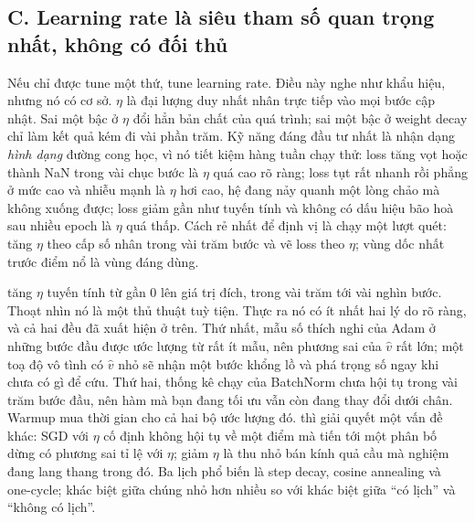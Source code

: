 \documentclass[../../../deep_learning.tex]{subfiles}
\begin{document}
\subsection{C. Learning rate là siêu tham số quan trọng nhất, không có đối thủ}
Nếu chỉ được tune một thứ, tune learning rate. Điều này nghe như khẩu hiệu, nhưng nó có cơ sở. \(\eta\) là đại lượng duy nhất nhân trực tiếp vào mọi bước cập nhật. Sai một bậc ở \(\eta\) đổi hẳn bản chất của quá trình; sai một bậc ở weight decay chỉ làm kết quả kém đi vài phần trăm. Kỹ năng đáng đầu tư nhất là nhận dạng \emph{hình dạng} đường cong học, vì nó tiết kiệm hàng tuần chạy thử: loss tăng vọt hoặc thành NaN trong vài chục bước là \(\eta\) quá cao rõ ràng; loss tụt rất nhanh rồi phẳng ở mức cao và nhiễu mạnh là \(\eta\) hơi cao, hệ đang nảy quanh một lòng chảo mà không xuống được; loss giảm gần như tuyến tính và không có dấu hiệu bão hoà sau nhiều epoch là \(\eta\) quá thấp. Cách rẻ nhất để định vị là chạy một lượt quét: tăng \(\eta\) theo cấp số nhân trong vài trăm bước và vẽ loss theo \(\eta\); vùng dốc nhất trước điểm nổ là vùng đáng dùng.

 tăng \(\eta\) tuyến tính từ gần \(0\) lên giá trị đích, trong vài trăm tới vài nghìn bước. Thoạt nhìn nó là một thủ thuật tuỳ tiện. Thực ra nó có ít nhất hai lý do rõ ràng, và cả hai đều đã xuất hiện ở trên. Thứ nhất, mẫu số thích nghi của Adam ở những bước đầu được ước lượng từ rất ít mẫu, nên phương sai của \(\hat v\) rất lớn; một toạ độ vô tình có \(\hat v\) nhỏ sẽ nhận một bước khổng lồ và phá trọng số ngay khi chưa có gì để cứu. Thứ hai, thống kê chạy của BatchNorm chưa hội tụ trong vài trăm bước đầu, nên hàm mà bạn đang tối ưu vẫn còn đang thay đổi dưới chân. Warmup mua thời gian cho cả hai bộ ước lượng đó.  thì giải quyết một vấn đề khác: SGD với \(\eta\) cố định không hội tụ về một điểm mà tiến tới một phân bố dừng có phương sai tỉ lệ với \(\eta\); giảm \(\eta\) là thu nhỏ bán kính quả cầu mà nghiệm đang lang thang trong đó. Ba lịch phổ biến là step decay, cosine annealing \cite{loshchilov2017sgdr} và one-cycle; khác biệt giữa chúng nhỏ hơn nhiều so với khác biệt giữa ``có lịch'' và ``không có lịch''.
\end{document}
